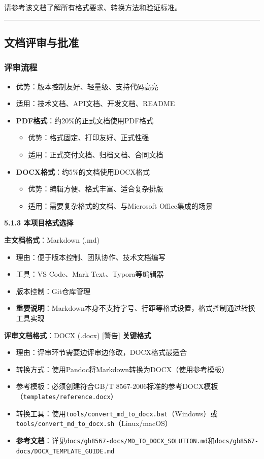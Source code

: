\documentclass[12pt,a4paper]{article}
\numberwithin{equation}{section}  %
\begin{document}
请参考该文档了解所有格式要求、转换方法和验证标准。

\hrule
\subsection{文档评审与批准}
\subsubsection{评审流程}
\begin{itemize}
\item 优势：版本控制友好、轻量级、支持代码高亮
\item 适用：技术文档、API文档、开发文档、README

\end{itemize}
\begin{itemize}
\item \textbf{PDF格式}：约20\%的正式文档使用PDF格式
\begin{itemize}
\item 优势：格式固定、打印友好、正式性强
\item 适用：正式交付文档、归档文档、合同文档

\end{itemize}
\item \textbf{DOCX格式}：约5\%的文档使用DOCX格式
\begin{itemize}
\item 优势：编辑方便、格式丰富、适合复杂排版
\item 适用：需要复杂格式的文档、与Microsoft Office集成的场景
\end{itemize}
\end{itemize}

\textbf{5.1.3 本项目格式选择}

\textbf{主文档格式}：Markdown (.md)
\begin{itemize}
\item 理由：便于版本控制、团队协作、技术文档编写
\item 工具：VS Code、Mark Text、Typora等编辑器
\item 版本控制：Git仓库管理
\item \textbf{重要说明}：Markdown本身不支持字号、行距等格式设置，格式控制通过转换工具实现
\end{itemize}

\textbf{评审文档格式}：DOCX (.docx) [警告] \textbf{关键格式}
\begin{itemize}
\item 理由：评审环节需要边评审边修改，DOCX格式最适合
\item 转换方式：使用Pandoc将Markdown转换为DOCX（使用参考模板）
\item 参考模板：必须创建符合GB/T 8567-2006标准的参考DOCX模板（\texttt{templates/reference.docx}）
\item 转换工具：使用\texttt{tools/convert\_md\_to\_docx.bat}（Windows）或\texttt{tools/convert\_md\_to\_docx.sh}（Linux/macOS）
\item \textbf{参考文档}：详见\texttt{docs/gb8567-docs/MD\_TO\_DOCX\_SOLUTION.md}和\texttt{docs/gb8567-docs/DOCX\_TEMPLATE\_GUIDE.md}
\end{itemize}
\end{document}
